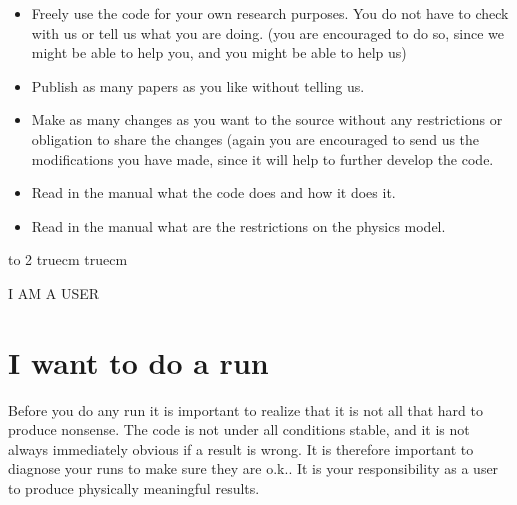\documentclass{report}
\begin{document}
\begin{itemize} 

\item Freely use the code for your own research purposes. You do not have to check with 
us or tell us what you are doing. (you are encouraged to do so, since we might be able 
to help you, and you might be able to help us) 

\item Publish as many papers as you like without telling us.

\item Make as many changes as you want to the source without any restrictions or 
obligation to share the changes (again you are encouraged to send us the modifications 
you have made, since it will help to further develop the code.

\item Read in the manual what the code does and how it does it.

\item Read in the manual what are the restrictions on the physics model.

\end{itemize} 



\cleardoublepage 

\tableofcontents
\cleardoublepage


\vfill \eject 
\hbox to 2 truecm{\hfill}
 truecm 

\centerline{\selectfont \Huge I AM A USER} 

\vfill  \eject 

\chapter{I want to do a run} 

Before you do any run it is important to realize that it is not all that hard to produce nonsense. 
The code is not under all conditions stable, and it is not always immediately obvious if a 
result is wrong. It is therefore important to diagnose your runs to make sure they are o.k.. 
It is your responsibility as a user to produce physically meaningful results. %
\end{document}
